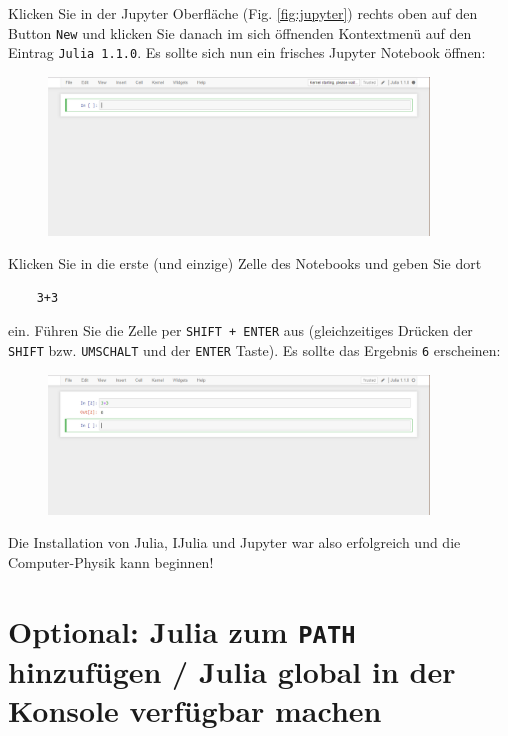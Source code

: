 \documentclass[11pt, a4paper]{scrartcl}
\begin{document}
	Klicken Sie in der Jupyter Oberfläche (Fig. \ref{fig:jupyter}) rechts oben auf den Button \texttt{New} und klicken Sie danach im sich öffnenden Kontextmenü auf den Eintrag \texttt{Julia 1.1.0}. Es sollte sich nun ein frisches Jupyter Notebook öffnen:
	
	\begin{figure}[h!]
	\centering
	\includegraphics[width=0.9\textwidth]{imgs/jupyter_notebook.png}
	\end{figure}

	Klicken Sie in die erste (und einzige) Zelle des Notebooks und geben Sie dort
	
	\begin{lstlisting}
	3+3
	\end{lstlisting}
	ein. Führen Sie die Zelle per \texttt{SHIFT + ENTER} aus (gleichzeitiges Drücken der \texttt{SHIFT} bzw. \texttt{UMSCHALT} und der \texttt{ENTER} Taste). Es sollte das Ergebnis \texttt{6} erscheinen:

	\begin{figure}[h!]
	\centering
	\includegraphics[width=0.9\textwidth]{imgs/jupyter_notebook_test.png}
	\end{figure}	

	Die Installation von Julia, IJulia und Jupyter war also erfolgreich und die Computer-Physik kann beginnen!
	
	

	\newpage
	\section{Optional: Julia zum \texttt{PATH} hinzufügen / Julia global in der Konsole verfügbar machen}
	
\end{document}
